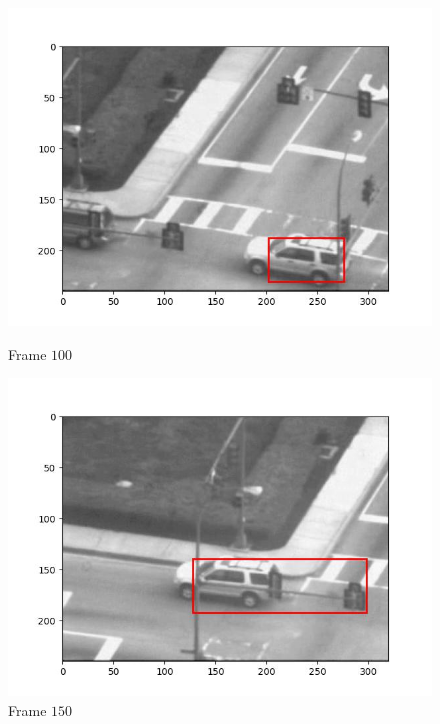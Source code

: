 \begin{figure}[H]
\begin{minipage}{.49\textwidth}
    \includegraphics[width=\textwidth]{./figures/lk_affine/car2/frame000100.jpg}
    \caption{Frame $100$}
  \end{minipage}
  \begin{minipage}{.49\textwidth}
    \centering
    \includegraphics[width=\textwidth]{./figures/lk_affine/car2/frame000150.jpg}
    \caption{Frame $150$}
  \end{minipage}
  \hfill
  \begin{minipage}{.49\textwidth}
    \centering

\end{minipage}
\end{figure}
